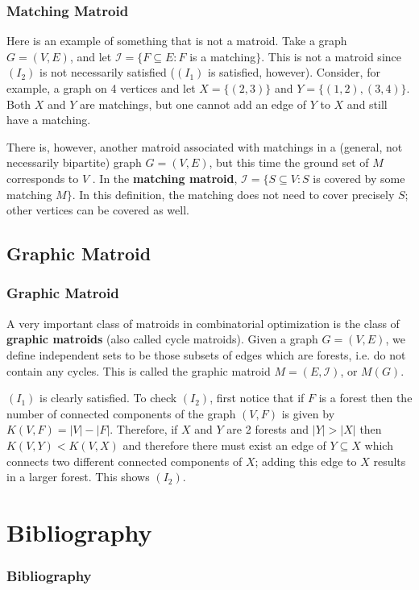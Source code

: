 \documentclass{beamer}
\begin{document}
\begin{frame}\frametitle{Matching Matroid}
\begin{block}{}
Here is an example of something that is not a matroid. Take a graph $G = (V, E)$, and let $\mathcal{I} = \lbrace F \subseteq E : F$ is a matching$\rbrace$. This is not a matroid since $(I_2)$ is not necessarily satisfied ($(I_1)$ is satisfied, however). Consider, for example, a graph on 4 vertices and let $X = \lbrace (2, 3) \rbrace$ and $Y = \lbrace (1, 2), (3, 4) \rbrace$. Both $X$ and $Y$ are matchings, but one cannot add an edge of $Y$ to $X$ and still have a matching.
\end{block}
\begin{block}{}
There is, however, another matroid associated with matchings in a (general, not necessarily bipartite) graph $G = (V, E)$, but this time the ground set of $M$ corresponds to $V$ . In the \textbf{matching matroid}, $\mathcal{I} = \lbrace S \subseteq V : S$ is covered by some matching $M \rbrace$. In this definition, the matching does not need to cover precisely $S$; other vertices can be covered as well.
\end{block}
\end{frame}

\subsection{Graphic Matroid}
\begin{frame}\frametitle{Graphic Matroid}
\begin{block}{}
A very important class of matroids in combinatorial optimization is the class of \textbf{graphic matroids} (also called cycle matroids). Given a graph $G = (V, E)$, we define independent sets to be those subsets of edges which are forests, i.e. do not contain any cycles. This is called the graphic matroid $M = (E, \mathcal{I})$, or $M(G)$.
\end{block}
\begin{block}{}
$(I_1)$ is clearly satisfied. To check $(I_2)$, first notice that if $F$ is a forest then the number of connected components of the graph $(V, F)$ is given by $K(V, F) = |V| − |F|$. Therefore, if $X$ and $Y$ are 2 forests and $|Y| > |X|$ then $K(V, Y) < K(V, X)$ and therefore there must exist an edge of $Y \subseteq X$ which connects two different connected components of $X$; adding this edge to $X$ results in a larger forest. This shows $(I_2)$.
\end{block}
\end{frame}

\section{Bibliography}
\begin{frame}[allowframebreaks]
\frametitle{Bibliography}
    \tiny{ }
    
\end{frame}
\end{document}
